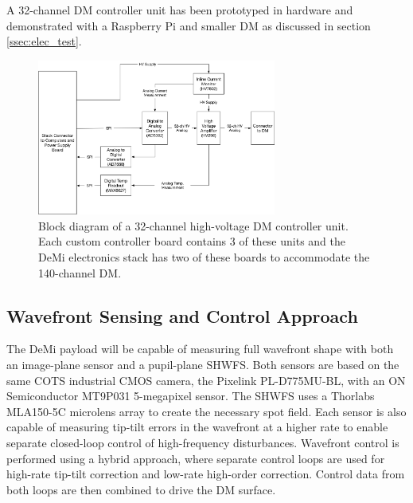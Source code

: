 \documentclass[]{spie}  %
\begin{document}
A 32-channel DM controller unit has been prototyped in hardware and demonstrated with a Raspberry Pi and smaller DM as discussed in section \ref{ssec:elec_test}.

\begin{figure}
\centering
\includegraphics[width=0.70\textwidth]{DM_Controller.png}
\caption{\label{fig:DM controller}Block diagram of a 32-channel high-voltage DM controller unit. Each custom controller board contains 3 of these units and the DeMi electronics stack has two of these boards to accommodate the 140-channel DM.}
\end{figure}



\subsection{Wavefront Sensing and Control Approach} %
\label{ssec:wf_sns_control}
The DeMi payload will be capable of measuring full wavefront shape with both an image-plane sensor and a pupil-plane \gls{SHWFS}. Both sensors are based on the same \gls{COTS} industrial CMOS camera, the Pixelink PL-D775MU-BL, with an ON Semiconductor MT9P031 5-megapixel sensor. The SHWFS uses a Thorlabs MLA150-5C microlens array to create the necessary spot field. Each sensor is also capable of measuring tip-tilt errors in the wavefront at a higher rate to enable separate closed-loop control of high-frequency disturbances. Wavefront control is performed using a hybrid approach, where separate control loops are used for high-rate tip-tilt correction and low-rate high-order correction. Control data from both loops are then combined to drive the DM surface. 
\end{document}

